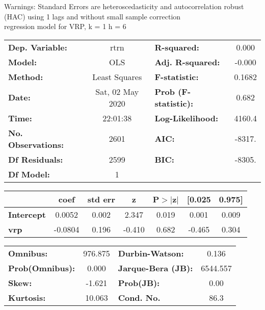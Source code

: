 Warnings: \newline
 [1] Standard Errors are heteroscedasticity and autocorrelation robust (HAC) using 1 lags and without small sample correction\\ 

regression model for VRP, k = 1 h = 6\begin{center}
\begin{tabular}{lclc}
\toprule
\textbf{Dep. Variable:}    &       rtrn       & \textbf{  R-squared:         } &     0.000   \\
\textbf{Model:}            &       OLS        & \textbf{  Adj. R-squared:    } &    -0.000   \\
\textbf{Method:}           &  Least Squares   & \textbf{  F-statistic:       } &    0.1682   \\
\textbf{Date:}             & Sat, 02 May 2020 & \textbf{  Prob (F-statistic):} &    0.682    \\
\textbf{Time:}             &     22:01:38     & \textbf{  Log-Likelihood:    } &    4160.4   \\
\textbf{No. Observations:} &        2601      & \textbf{  AIC:               } &    -8317.   \\
\textbf{Df Residuals:}     &        2599      & \textbf{  BIC:               } &    -8305.   \\
\textbf{Df Model:}         &           1      & \textbf{                     } &             \\
\bottomrule
\end{tabular}
\begin{tabular}{lcccccc}
                   & \textbf{coef} & \textbf{std err} & \textbf{z} & \textbf{P$> |$z$|$} & \textbf{[0.025} & \textbf{0.975]}  \\
\midrule
\textbf{Intercept} &       0.0052  &        0.002     &     2.347  &         0.019        &        0.001    &        0.009     \\
\textbf{vrp}       &      -0.0804  &        0.196     &    -0.410  &         0.682        &       -0.465    &        0.304     \\
\bottomrule
\end{tabular}
\begin{tabular}{lclc}
\textbf{Omnibus:}       & 976.875 & \textbf{  Durbin-Watson:     } &    0.136  \\
\textbf{Prob(Omnibus):} &   0.000 & \textbf{  Jarque-Bera (JB):  } & 6544.557  \\
\textbf{Skew:}          &  -1.621 & \textbf{  Prob(JB):          } &     0.00  \\
\textbf{Kurtosis:}      &  10.063 & \textbf{  Cond. No.          } &     86.3  \\
\bottomrule
\end{tabular}
\end{center}

